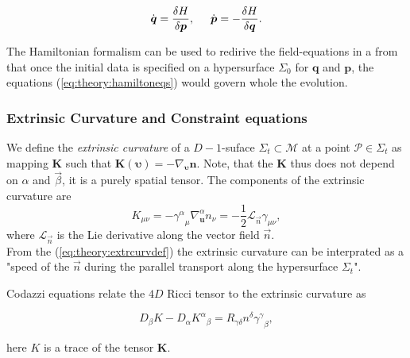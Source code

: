 \documentclass[11pt,a4paper,headinclude=true,DIV=14,BCOR=8mm,chapterprefix,listof=totoc,twoside,openright,abstracton]{scrbook}
\begin{document}
\begin{equation}
    \dot{\boldsymbol{q}}=\frac{\delta H}{\delta\boldsymbol{p}}, \hspace{5mm} \dot{\boldsymbol{p}} = -\frac{\delta H}{\delta\boldsymbol{q}}.
    \label{eq:theory:hamiltoneqs}
\end{equation}

The Hamiltonian formalism can be used to redirive the field-equations in a from that once the initial data is specified on a hypersurface $\Sigma_0$ for $\boldsymbol{q}$ and $\boldsymbol{p}$, the equations (\ref{eq:theory:hamiltoneqs}) would govern whole the evolution.


\subsubsection{Extrinsic Curvature and Constraint equations}

We define the \textit{extrinsic curvature} of a $D-1$-suface $\Sigma_t\subset\mathcal{M}$ at a point $\mathcal{P}\in\Sigma_t$ as mapping $\boldsymbol{K}$ such that $\boldsymbol{K}(\boldsymbol{\upsilon})=-\nabla_{\boldsymbol{\upsilon}}\boldsymbol{n}$. Note, that the $\boldsymbol{K}$ thus does not depend on $\alpha$ and $\vec{\beta}$, it is a purely spatial tensor. The components of the extrinsic curvature are \\

\begin{equation}
    K_{\mu\nu} = -{\gamma^{\alpha}}_{\mu}\nabla_{\boldsymbol{u}}^{\alpha} n_{\nu} = -\frac{1}{2}\mathcal{L}_{\vec{n}}\gamma_{\mu\nu},
    \label{eq:theory:extrcurvdef}
\end{equation}
where $\mathcal{L}_{\vec{n}}$ is the Lie derivative along the vector field $\vec{n}$. \\
From the (\ref{eq:theory:extrcurvdef}) the extrinsic curvature can be interprated as a "speed of the $\vec{n}$ during the parallel transport along the hypersurface $\Sigma_t$".

Codazzi equations relate the $4D$ Ricci tensor to the extrinsic curvature as

\begin{equation}
    D_{\beta}K-D_{\alpha}{K^{\alpha}}_{\beta}=R_{\gamma\delta}n^{\delta}{\gamma^{\gamma}}_{\beta},
    \label{eq:theory:formomentum}
\end{equation}

here $K$ is a trace of the tensor $\boldsymbol{K}$. \\
\end{document}
